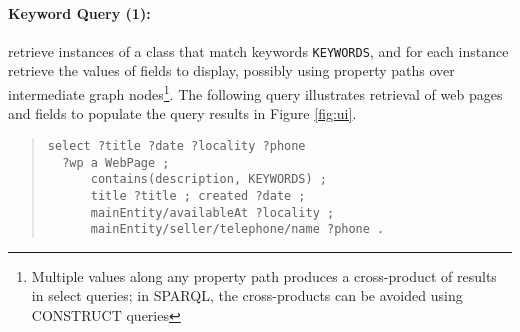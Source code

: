 \paragraph{Keyword Query (1):} 
retrieve instances of a class that match keywords \verb|KEYWORDS|, and for each instance retrieve the values of fields to display, possibly using property paths over intermediate graph nodes\footnote{Multiple values along any property path produces a cross-product of results in select queries; in SPARQL, the cross-products can be avoided using  CONSTRUCT queries}.
The following query illustrates retrieval of web pages and fields to populate the query results in Figure \ref{fig:ui}.
\begin{quote}
{\footnotesize
\begin{verbatim}
select ?title ?date ?locality ?phone
  ?wp a WebPage ; 
      contains(description, KEYWORDS) ;   
      title ?title ; created ?date ;
      mainEntity/availableAt ?locality ;
      mainEntity/seller/telephone/name ?phone .
\end{verbatim}}
\end{quote}


